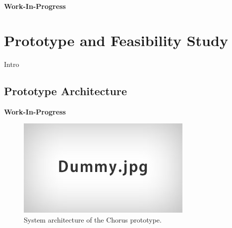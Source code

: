 \documentclass{llncs}
\begin{document}
{			\textbf{Work-In-Progress}
			
					


	\section{Prototype and Feasibility Study}
		\label{s:section-6}	
			
		Intro
		
%		
%		
%		
%		
%		
%		
		
		\subsection{Prototype Architecture}
			\label{ss:protoype}				

			\textbf{Work-In-Progress}

			\begin{figure}[H]
				\centering
				\includegraphics[scale=0.4]{Figures/Dummy.jpg}
				\caption{System architecture of the Chorus prototype.}	
				\label{fig:prototype-system-architecture}
			\end{figure}
	



}
\end{document}
